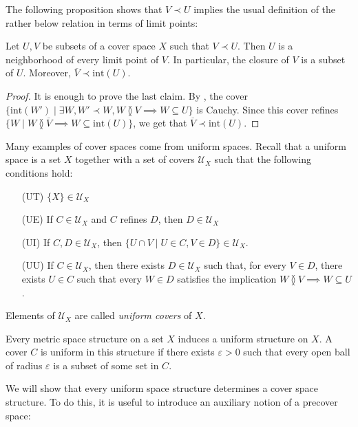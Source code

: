 \documentclass[reqno]{amsart}
\newcommand{\axitem}[1]{\phantomsection \label{ax:#1}}
\theoremstyle{definition}
\theoremstyle{remark}
\numberwithin{figure}{section}
\newcommand{\overlap}[2]{#1 \between #2}
\newcommand{\rb}{\prec}
\begin{document}
The following proposition shows that $V \rb U$ implies the usual definition of the rather below relation in terms of limit points:

\begin{prop}[rb-closure]
Let $U,V$ be subsets of a cover space $X$ such that $V \rb U$.
Then $U$ is a neighborhood of every limit point of $V$.
In particular, the closure of $V$ is a subset of $U$.
Moreover, $\overline{V} \rb \mathrm{int}(U)$.
\end{prop}
\begin{proof}
It is enough to prove the last claim.
By , the cover $\{ \mathrm{int}(W') \mid \exists W, W' \rb W, \overlap{W}{V} \implies W \subseteq U \}$ is Cauchy.
Since this cover refines $\{ W \mid \overlap{W}{\overline{V}} \implies W \subseteq \mathrm{int}(U) \}$, we get that $\overline{V} \rb \mathrm{int}(U)$.
\end{proof}

Many examples of cover spaces come from uniform spaces.
Recall that a uniform space is a set $X$ together with a set of covers $\mathcal{U}_X$ such that the following conditions hold:
\begin{itemize}
\item[(UT)] $\{ X \} \in \mathcal{U}_X$
\item[(UE)] If $C \in \mathcal{U}_X$ and $C$ refines $D$, then $D \in \mathcal{U}_X$
\item[(UI)] \axitem{UI} If $C,D \in \mathcal{U}_X$, then $\{ U \cap V \mid U \in C, V \in D \} \in \mathcal{U}_X$.
\item[(UU)] \axitem{UU} If $C \in \mathcal{U}_X$, then there exists $D \in \mathcal{U}_X$ such that, for every $V \in D$,
there exists $U \in C$ such that every $W \in D$ satisfies the implication $\overlap{W}{V} \implies W \subseteq U$.
\end{itemize}
Elements of $\mathcal{U}_X$ are called \emph{uniform covers} of $X$.

\begin{example}
Every metric space structure on a set $X$ induces a uniform structure on $X$.
A cover $C$ is uniform in this structure if there exists $\varepsilon > 0$ such that every open ball of radius $\varepsilon$ is a subset of some set in $C$.
\end{example}

We will show that every uniform space structure determines a cover space structure.
To do this, it is useful to introduce an auxiliary notion of a precover space:
\end{document}
